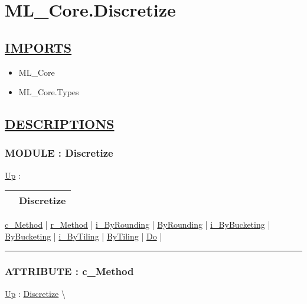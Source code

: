\chapter*{ML\_Core.Discretize}
\hypertarget{ecldoc:toc:ML_Core.Discretize}{}

\section*{\underline{IMPORTS}}
\begin{itemize}
\item ML\_Core
\item ML\_Core.Types
\end{itemize}

\section*{\underline{DESCRIPTIONS}}
\subsection*{MODULE : Discretize}
\hypertarget{ecldoc:ML_Core.Discretize}{}
\hyperlink{ecldoc:toc:ML_Core}{Up} :

{\renewcommand{\arraystretch}{1.5}
\begin{tabularx}{\textwidth}{|>{\raggedright\arraybackslash}l|X|}
\hline
\hspace{0pt} & Discretize \\
\hline
\end{tabularx}
}

\par


\hyperlink{ecldoc:ecldoc-c_Method}{c\_Method}  |
\hyperlink{ecldoc:ml_core.discretize.r_method}{r\_Method}  |
\hyperlink{ecldoc:ml_core.discretize.i_byrounding}{i\_ByRounding}  |
\hyperlink{ecldoc:ml_core.discretize.byrounding}{ByRounding}  |
\hyperlink{ecldoc:ml_core.discretize.i_bybucketing}{i\_ByBucketing}  |
\hyperlink{ecldoc:ml_core.discretize.bybucketing}{ByBucketing}  |
\hyperlink{ecldoc:ml_core.discretize.i_bytiling}{i\_ByTiling}  |
\hyperlink{ecldoc:ml_core.discretize.bytiling}{ByTiling}  |
\hyperlink{ecldoc:ml_core.discretize.do}{Do}  |

\rule{\linewidth}{0.5pt}

\subsection*{ATTRIBUTE : c\_Method}
\hypertarget{ecldoc:ecldoc-c_Method}{}
\hyperlink{ecldoc:ML_Core.Discretize}{Up} :
\hspace{0pt} \hyperlink{ecldoc:ML_Core.Discretize}{Discretize} \textbackslash 

